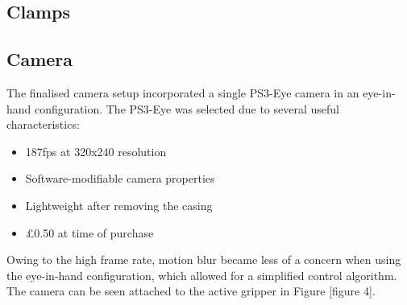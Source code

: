 \documentclass[conference]{IEEEtran}
\begin{document}
\subsection{Clamps}

\subsection{Camera}
The finalised camera setup incorporated a single PS3-Eye camera in an eye-in-hand configuration. The PS3-Eye was selected due to several useful characteristics:
\begin{itemize}
	\item 187fps at 320x240 resolution
	
	\item Software-modifiable camera properties
	
	\item Lightweight after removing the casing
	
	\item £0.50 at time of purchase
\end{itemize}

Owing to the high frame rate, motion blur became less of a concern when using the eye-in-hand configuration, which allowed for a simplified control algorithm. The camera can be seen attached to the active gripper in Figure [figure 4].
\end{document}
